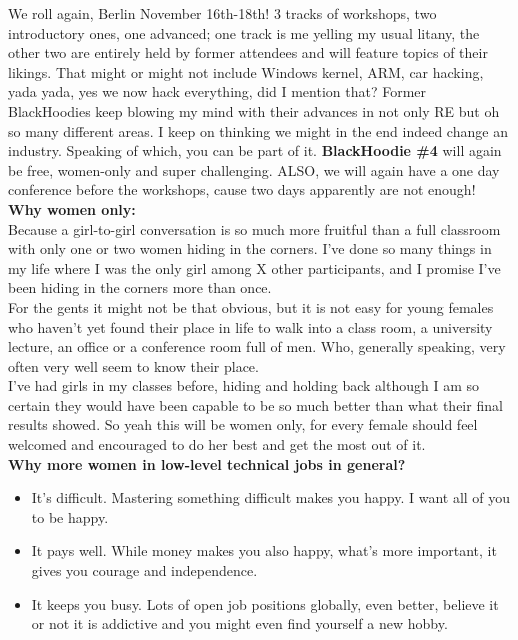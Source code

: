 \def\pagetitletext{BlackHoodie \#4 - rocking as hell}

We roll again, Berlin November 16th-18th! 3 tracks of workshops, two introductory ones, one  advanced; one track is me yelling my usual litany, the other two are entirely held by former attendees and will feature topics of their likings. That might or might not include Windows kernel, ARM, car hacking, yada yada, yes we now hack everything, did I mention that? Former BlackHoodies keep blowing my mind with their advances in not only RE but oh so many different areas. I keep on thinking we might in the end indeed change an industry. Speaking of which, you can be part of it. \textbf{BlackHoodie \#4} will again be free, women-only and super challenging. ALSO, we will again have a one day conference before the workshops, cause two days apparently are not enough!\\

\textbf{Why women only:} \\

Because a girl-to-girl conversation is so much more fruitful than a full classroom with only one or two women hiding in the corners. I’ve done so many things in my life where I was the only girl among X other participants, and I promise I’ve been hiding in the corners more than once.\\

For the gents it might not be that obvious, but it is not easy for young females who haven’t yet found their place in life to walk into a class room, a university lecture, an office or a conference room full of men. Who, generally speaking, very often very well seem to know their place.\\

I’ve had girls in my classes before, hiding and holding back although I am so certain they would have been capable to be so much better than what their final results showed. So yeah this will be women only, for every female should feel welcomed and encouraged to do her best and get the most out of it.\\

\textbf{Why more women in low-level technical jobs in general?}

\begin{itemize}
	\item It’s difficult. Mastering something difficult makes you happy. I want all of you to be happy.
	\item It pays well. While money makes you also happy, what’s more important, it gives you courage and independence.
	\item It keeps you busy. Lots of open job positions globally, even better, believe it or not it is addictive and you might even find yourself a new hobby.
\end{itemize}

